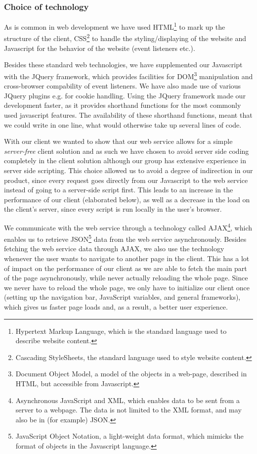 \subsubsection{Choice of technology}

As is common in web development we have used HTML\footnote{Hypertext Markup Language,
which is the standard language used to describe website content.} to mark up the
structure of the client, CSS\footnote{Cascading StyleSheets, the standard language
used to style website content.} to handle the styling/displaying of the website and
Javascript for the behavior of the website (event listeners etc.).

Besides these standard web technologies, we have supplemented
our Javascript with the JQuery framework, which provides facilities for
DOM\footnote{Document Object Model, a model of the objects in a web-page, described in
HTML, but accessible from Javascript.} manipulation and cross-browser compability of
event listeners. We have also made use of various JQuery plugins e.g. for cookie handling.
Using the JQuery framework made our development faster, as it provides shorthand functions for the most commonly used javascript features. The availability of these shorthand functions, meant that we could write in one line, what would otherwise take up several lines of code.

With our client we wanted to show that our web service allows for a simple \emph{server-free}
client solution and as such we have chosen to avoid server side coding completely in the
client solution although our group has extensive experience in server side scripting. This
choice allowed us to avoid a degree of indirection in our product, since every request goes
directly from our Javascript to the web service instead of going to a server-side script
first. This leads to an increase in the performance of our client (elaborated below), as well as a decrease in the load on the client's server, since every script is run locally in the user's browser.

We communicate with the web service through a technology called AJAX\footnote{Asynchronous
JavaScript and XML, which enables data to be sent from a server to a webpage. The data is
not limited to the XML format, and may also be in (for example) JSON.}, which enables us to
retrieve JSON\footnote{JavaScript Object Notation, a light-weight data format, which mimicks
the format of objects in the Javascript language.} data from the web service asynchronously.
Besides fetching the web service data through AJAX, we also use the technology whenever the
user wants to navigate to another page in the client. This has a lot of impact on the performance of our client as we are able to fetch the 
main part of the page asynchronously, while never actually reloading the whole page. Since we never have to reload the whole page, we only have to initialize our client once (setting up the navigation bar, JavaScript variables, and general frameworks), which gives us faster page loads and, as a result, a better user experience.

